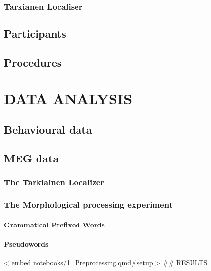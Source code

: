 \documentclass[
]{article}
\let\oldparagraph\paragraph
\renewcommand{\paragraph}[1]{\oldparagraph{#1}\mbox{}}
\begin{document}
\subsubsection{Tarkianen Localiser}\label{tarkianen-localiser}

\subsection{Participants}\label{participants}

\subsection{Procedures}\label{procedures}

\section{DATA ANALYSIS}\label{data-analysis}

\subsection{Behavioural data}\label{behavioural-data}

\subsection{MEG data}\label{meg-data}

\subsubsection{The Tarkiainen Localizer}\label{the-tarkiainen-localizer}

\subsubsection{The Morphological processing
experiment}\label{the-morphological-processing-experiment}

\paragraph{Grammatical Prefixed Words}\label{grammatical-prefixed-words}

\paragraph{Pseudowords}\label{pseudowords}

{{< embed notebooks/1_Preprocessing.qmd#setup >}} \#\# RESULTS
\end{document}
